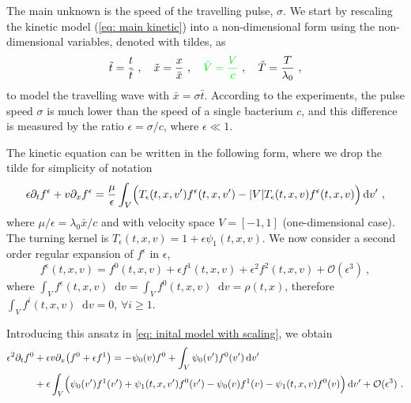 \documentclass[11pt,twoside]{article}
\theoremstyle{nonumberplain}
\newcommand*\diff{\mathop{}\!\mathrm{d}}
\newcommand{\e}{\epsilon}
\begin{document}
The main unknown is the speed of the travelling pulse, $\sigma$. We start by rescaling the kinetic model (\ref{eq: main kinetic}) into a non-dimensional form using the non-dimensional variables, denoted with tildes, as
\begin{equation}
    \tilde{t}= \frac{{t}}{\bar{t}}\ , \quad \tilde{x} = \frac{x}{\bar{x}}\ , \quad {\color{green}\tilde{V} = \frac{V}{c}}\ , \quad \tilde{T}=\frac{T}{\lambda_0}\ ,
    \nonumber
\end{equation}
to model the travelling wave with $\bar{x} = \sigma\bar{t}$. According to the experiments, the pulse
speed $\sigma$ is much lower than the speed of a single bacterium $c$, and this difference is measured by the ratio $\epsilon = \sigma / c$, where $\epsilon \ll 1$.



The kinetic equation can be written in the following form, where we  drop the tilde for simplicity of notation 
\begin{equation}
    \epsilon \partial_t f^\epsilon+{v}\partial_x f^\epsilon = \frac{\mu}{\epsilon}\int_V\Bigl(T_\epsilon(t,x,v')f^\epsilon(t,x,v')-|V|T_\epsilon(t,x,v)f^\epsilon(t,x,v)\Bigr)\diff v'\ , \label{eq: inital model with scaling}
\end{equation}
where $\mu/\epsilon=\lambda_0 \bar{x}/c$ and with velocity space \( V = [-1,1] \) (one-dimensional case). {\color{green}The turning kernel is $T_\epsilon(t,x,v)=1+\epsilon \psi_1(t,x,v)$}.
We now consider a second order regular expansion of $f^\e$ in $\epsilon$, 
\begin{equation*}
f^\e(t,{x},{v})=f^0(t,{x},{v})+\epsilon f^1(t,{x},{v})+\epsilon^2 f^2(t,{x},{v})+\mathcal{O}(\epsilon^3)\ , 
\end{equation*}
where $\int_V f^\e(t,{x},{v})\diff {v} = \int_V f^0(t,{x},{v})\diff {v} = \rho(t,{x})$, therefore $\int_V f^i(t,{x},{v})\diff {v}=0$, $\forall i\geq 1$.






Introducing this ansatz in \eqref{eq: inital model with scaling}, we obtain
\iffalse
{\begin{align*}
    \epsilon^2\partial_t f^0&+\epsilon{v}\partial_x\big(f^0+\epsilon f^1  \big) 
    =-\psi_0(v) f^0+\int_V\psi_0(v')f^0(v')\diff v'\\
    &+\epsilon\int_V\Bigl(\psi_0(v')f^1(v')+\psi_1(t,x,v')f^0(v')-\psi_0(v)f^1(v)-\psi_1(t,x,v)f^0(v) \Bigr)\diff v'+{\mathcal{O}(\epsilon^3)}
      \ .
\end{align*}}
\end{document}
